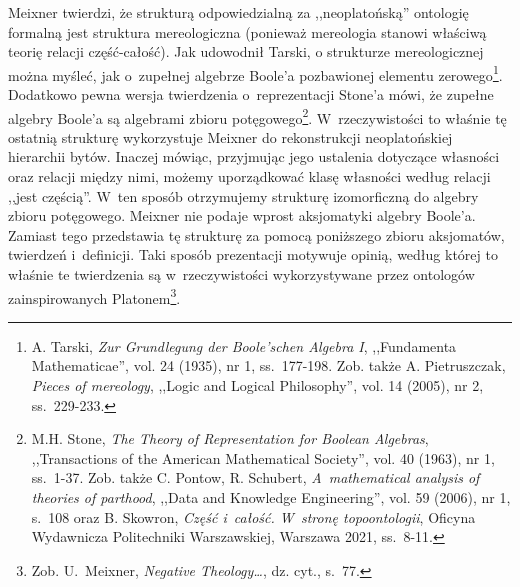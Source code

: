 Meixner twierdzi, że strukturą odpowiedzialną za ,,neoplatońską'' ontologię formalną jest struktura mereologiczna (ponieważ mereologia stanowi właściwą teorię relacji część-całość). Jak
udowodnił Tarski, o strukturze mereologicznej można myśleć, jak o~zupełnej algebrze Boole'a pozbawionej elementu zerowego\footnote{A. Tarski, \textit{Zur Grundlegung der Boole'schen Algebra I}, ,,Fundamenta Mathematicae'', vol. 24 (1935), nr 1, ss.~177-198. Zob. także A. Pietruszczak, \textit{Pieces of mereology}, ,,Logic and Logical Philosophy'', vol. 14 (2005), nr 2, ss.~229-233.}. Dodatkowo pewna wersja twierdzenia o~reprezentacji Stone'a mówi, że zupełne algebry Boole'a są algebrami zbioru potęgowego\footnote{M.H. Stone, \textit{The Theory of Representation for Boolean Algebras}, ,,Transactions of the American Mathematical Society'', vol. 40 (1963), nr 1, ss.~1-37. Zob. także C. Pontow, R. Schubert, \textit{A~mathematical analysis of theories of parthood}, ,,Data and Knowledge Engineering'', vol. 59 (2006), nr 1, s.~108 oraz B. Skowron, \textit{Część i~całość. W~stronę topoontologii}, Oficyna Wydawnicza Politechniki Warszawskiej, Warszawa 2021, ss.~8-11.}.
W~rzeczywistości to właśnie tę ostatnią strukturę wykorzystuje Meixner do rekonstrukcji neoplatońskiej hierarchii bytów. Inaczej mówiąc, przyjmując jego ustalenia dotyczące własności oraz relacji między nimi, możemy uporządkować klasę własności według relacji ,,jest częścią''. W~ten sposób otrzymujemy strukturę izomorficzną do algebry zbioru potęgowego. Meixner nie podaje wprost aksjomatyki algebry Boole'a. Zamiast tego przedstawia tę strukturę za pomocą poniższego zbioru aksjomatów, twierdzeń i~definicji. Taki sposób prezentacji motywuje opinią, według której to właśnie te twierdzenia są w~rzeczywistości wykorzystywane przez ontologów zainspirowanych Platonem\footnote{Zob. U.~Meixner, \textit{Negative Theology\ldots}, dz. cyt., s.~77.}.
